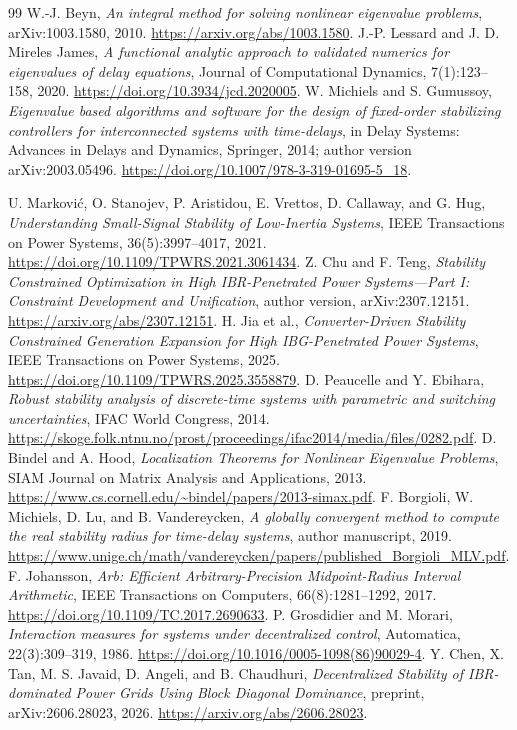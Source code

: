 \documentclass[11pt]{article}
\begin{document}
\begin{thebibliography}{99}
 W.-J. Beyn,
\emph{An integral method for solving nonlinear eigenvalue problems},
arXiv:1003.1580, 2010.
\url{https://arxiv.org/abs/1003.1580}.
 J.-P. Lessard and J. D. Mireles James,
\emph{A functional analytic approach to validated numerics for
eigenvalues of delay equations}, Journal of Computational Dynamics,
7(1):123--158, 2020.
\url{https://doi.org/10.3934/jcd.2020005}.
 W. Michiels and S. Gumussoy,
\emph{Eigenvalue based algorithms and software for the design of
fixed-order stabilizing controllers for interconnected systems with
time-delays}, in Delay Systems: Advances in Delays and Dynamics,
Springer, 2014; author version arXiv:2003.05496.
\url{https://doi.org/10.1007/978-3-319-01695-5_18}.

 U. Markovi\'c, O. Stanojev, P. Aristidou,
E. Vrettos, D. Callaway, and G. Hug,
\emph{Understanding Small-Signal Stability of Low-Inertia Systems},
IEEE Transactions on Power Systems, 36(5):3997--4017, 2021.
\url{https://doi.org/10.1109/TPWRS.2021.3061434}.
 Z. Chu and F. Teng,
\emph{Stability Constrained Optimization in High IBR-Penetrated
Power Systems---Part I: Constraint Development and Unification},
author version, arXiv:2307.12151.
\url{https://arxiv.org/abs/2307.12151}.
 H. Jia et al.,
\emph{Converter-Driven Stability Constrained Generation Expansion
for High IBG-Penetrated Power Systems},
IEEE Transactions on Power Systems, 2025.
\url{https://doi.org/10.1109/TPWRS.2025.3558879}.
 D. Peaucelle and Y. Ebihara,
\emph{Robust stability analysis of discrete-time systems with
parametric and switching uncertainties}, IFAC World Congress, 2014.
\url{https://skoge.folk.ntnu.no/prost/proceedings/ifac2014/media/files/0282.pdf}.
 D. Bindel and A. Hood,
\emph{Localization Theorems for Nonlinear Eigenvalue Problems},
SIAM Journal on Matrix Analysis and Applications, 2013.
\url{https://www.cs.cornell.edu/~bindel/papers/2013-simax.pdf}.
 F. Borgioli, W. Michiels, D. Lu, and B. Vandereycken,
\emph{A globally convergent method to compute the real stability
radius for time-delay systems}, author manuscript, 2019.
\url{https://www.unige.ch/math/vandereycken/papers/published_Borgioli_MLV.pdf}.
 F. Johansson,
\emph{Arb: Efficient Arbitrary-Precision Midpoint-Radius Interval
Arithmetic}, IEEE Transactions on Computers, 66(8):1281--1292, 2017.
\url{https://doi.org/10.1109/TC.2017.2690633}.
 P. Grosdidier and M. Morari,
\emph{Interaction measures for systems under decentralized control},
Automatica, 22(3):309--319, 1986.
\url{https://doi.org/10.1016/0005-1098(86)90029-4}.
 Y. Chen, X. Tan, M. S. Javaid, D. Angeli, and B. Chaudhuri,
\emph{Decentralized Stability of IBR-dominated Power Grids Using Block Diagonal Dominance},
preprint, arXiv:2606.28023, 2026.
\url{https://arxiv.org/abs/2606.28023}.
\end{thebibliography}
\end{document}
